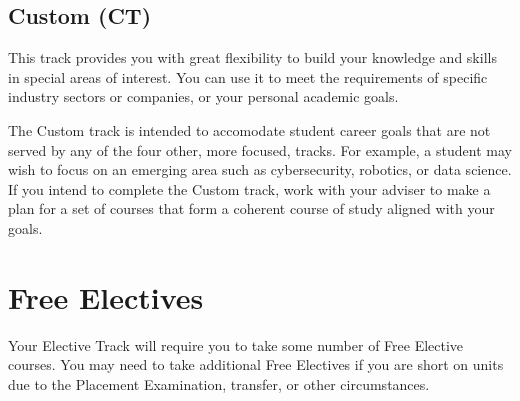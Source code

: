 \documentclass{book}
\newcommand{\cttrackname}{Custom (CT)}
\begin{document}
\subsection{\cttrackname}
\cttrackindex

This track provides you with great flexibility to build your knowledge and skills in special areas of interest. You can use it to meet the requirements of specific industry sectors or companies, or your personal academic goals.

The Custom track is intended to accomodate student career goals that are not served by any of the four other, more focused, tracks. For example, a student may wish to focus on an emerging area such as cybersecurity, robotics, or data science. If you intend to complete the Custom track, work with your adviser to make a plan for a set of courses that form a coherent course of study aligned with your goals.

\section{Free Electives}
\label{section:free_electives}

Your Elective Track will require you to take some number of Free Elective courses. You may need to take additional Free Electives if you are short on units due to the Placement Examination, transfer, or other circumstances.
\end{document}
